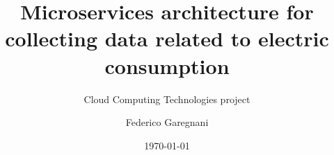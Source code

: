 \documentclass{beamer}
\title[CCT project]{Microservices architecture for collecting data related to electric consumption}
\subtitle{Cloud Computing Technologies project}
\author{Federico Garegnani}
\institute[UniMI]{Università degli Studi di Milano}
\date{\today}
\begin{document}
	\frame{\titlepage}
	
	
	
	
\end{document}
